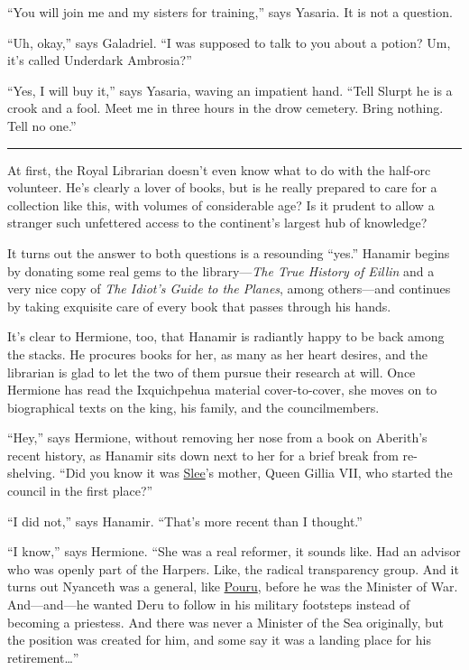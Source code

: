 \documentclass[smalldemyvopaper,11pt,twoside,onecolumn,openright,extrafontsizes]{memoir}
\begin{document}
``You will join me and my sisters for training,'' says Yasaria. It is
not a question.

``Uh, okay,'' says Galadriel. ``I was supposed to talk to you about a
potion? Um, it's called Underdark Ambrosia?''

``Yes, I will buy it,'' says Yasaria, waving an impatient hand. ``Tell
Slurpt he is a crook and a fool. Meet me in three hours in the drow
cemetery. Bring nothing. Tell no one.''

\begin{center}\rule{0.5\linewidth}{\linethickness}\end{center}

At first, the Royal Librarian doesn't even know what to do with the
half-orc volunteer. He's clearly a lover of books, but is he really
prepared to care for a collection like this, with volumes of
considerable age? Is it prudent to allow a stranger such unfettered
access to the continent's largest hub of knowledge?

It turns out the answer to both questions is a resounding ``yes.''
Hanamir begins by donating some real gems to the library---\emph{The
True History of Eillin} and a very nice copy of \emph{The Idiot's Guide
to the Planes}, among others---and continues by taking exquisite care of
every book that passes through his hands.

It's clear to Hermione, too, that Hanamir is radiantly happy to be back
among the stacks. He procures books for her, as many as her heart
desires, and the librarian is glad to let the two of them pursue their
research at will. Once Hermione has read the Ixquichpehua material
cover-to-cover, she moves on to biographical texts on the king, his
family, and the councilmembers.

``Hey,'' says Hermione, without removing her nose from a book on
Aberith's recent history, as Hanamir sits down next to her for a brief
break from re-shelving. ``Did you know it was
\href{/characters/slee/}{Slee}'s mother, Queen Gillia VII, who started
the council in the first place?''

``I did not,'' says Hanamir. ``That's more recent than I thought.''

``I know,'' says Hermione. ``She was a real reformer, it sounds like.
Had an advisor who was openly part of the Harpers. Like, the radical
transparency group. And it turns out Nyanceth was a general, like
\href{/characters/pouru/}{Pouru}, before he was the Minister of War.
And---and---he wanted Deru to follow in his military footsteps instead
of becoming a priestess. And there was never a Minister of the Sea
originally, but the position was created for him, and some say it was a
landing place for his retirement\ldots{}''
\end{document}
